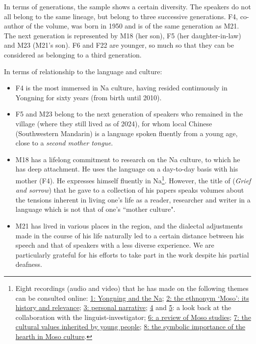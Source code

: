 In terms of generations, the sample shows a certain diversity. The speakers do not all belong to the same lineage, but belong to three successive generations. F4, co-author of the volume, was born in 1950 and is of the same generation as M21. The next generation is represented by M18 (her son), F5 (her daughter-in-law) and M23 (M21's son). F6 and F22 are younger, so much so that they can be considered as belonging to a third generation.

In terms of relationship to the language and culture:

\begin{itemize}
    \item F4 is the most immersed in Na culture, having resided continuously in Yongning for sixty years (from birth until 2010).
    \item F5 and M23 belong to the next generation of speakers who remained in the village (where they still lived as of 2024), for whom local Chinese (Southwestern Mandarin) is a language spoken fluently from a young age, close to a \emph{second mother tongue}.
    \item M18 has a lifelong commitment to research on the Na culture, to which he has deep attachment. He uses the language on a day-to-day basis with his mother (F4). He expresses himself fluently in Na\footnote{Eight recordings (audio and video) that he has made on the following themes can be consulted online:
    \href{https://doi.org/10.24397/pangloss-0007734}{1: Yongning and the Na}; \href{https://doi.org/10.24397/pangloss-0007740}{2: the ethnonym `Moso': its history and relevance}; \href{https://doi.org/10.24397/pangloss-0007730}{3: personal narrative}; \href{https://doi.org/10.24397/pangloss-0007736}{4} and \href{https://doi.org/10. 24397/pangloss-0007738}{5}: a look back at the collaboration with the linguist-investigator; \href{https://doi.org/10.24397/pangloss-0007742}{6: a review of Moso studies}; \href{https://doi.org/10.24397/pangloss-0007728}{7: the cultural values inherited by young people}; \href{https://doi.org/10.24397/pangloss-0007732}{8: the symbolic importance of the hearth in Moso culture}.}.
    However, the title of  (\emph{Grief and sorrow}) that he gave to a collection of his papers \parencite{latami2016} speaks volumes about the tensions inherent in living one's life as a reader, researcher and writer in a language which is not that of one's ``mother culture".
    \item M21 has lived in various places in the region, and the dialectal adjustments made in the course of his life naturally led to a certain distance between his speech and that of speakers with a less diverse experience. We are particularly grateful for his efforts to take part in the work despite his partial deafness.
\end{itemize}

